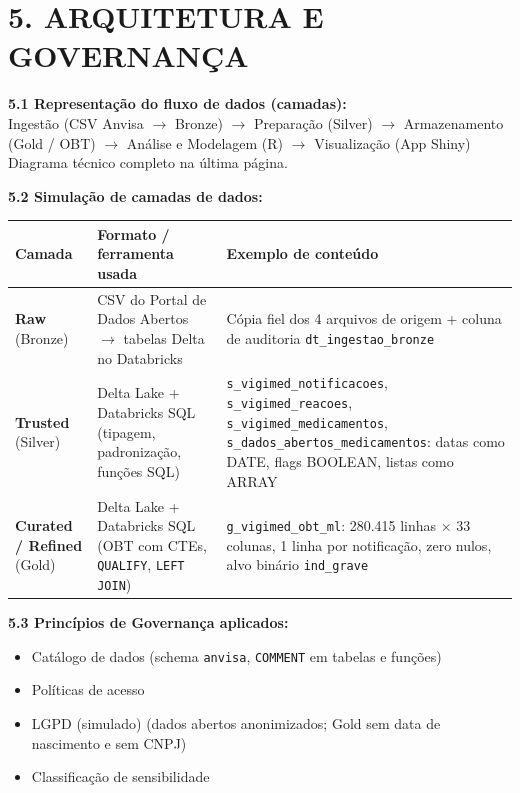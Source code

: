 \documentclass[11pt, a4paper]{article}
\newcommand{\cboxx}{$\boxtimes$} %
\newcommand{\cbox}{\leavevmode\vbox{\hrule\hbox{\vrule height 1.6ex \kern 1.6ex \vrule}\hrule}}
\newcommand{\var}[1]{\texttt{#1}}
\begin{document}
\vspace{6pt}
\section*{5. ARQUITETURA E GOVERNANÇA}

\textbf{5.1 Representação do fluxo de dados (camadas):}\\
Ingestão (CSV Anvisa $\rightarrow$ Bronze) $\rightarrow$ Preparação (Silver) $\rightarrow$ Armazenamento (Gold / OBT) $\rightarrow$ Análise e Modelagem (R) $\rightarrow$ Visualização (App Shiny)\\
{\small Diagrama técnico completo na última página.}

\vspace{4pt}
\textbf{5.2 Simulação de camadas de dados:}

\vspace{2pt}
{\small
\begin{tabular}{|L{0.20\textwidth}|L{0.33\textwidth}|L{0.36\textwidth}|}
\hline
\textbf{Camada} & \textbf{Formato / ferramenta usada} & \textbf{Exemplo de conteúdo} \\
\hline
\textbf{Raw} \newline (Bronze) & CSV do Portal de Dados Abertos $\rightarrow$ tabelas Delta no Databricks & Cópia fiel dos 4 arquivos de origem + coluna de auditoria \var{dt\_ingestao\_bronze} \\
\hline
\textbf{Trusted} \newline (Silver) & Delta Lake + Databricks SQL (tipagem, padronização, funções SQL) & \var{s\_vigimed\_notificacoes}, \var{s\_vigimed\_reacoes}, \var{s\_vigimed\_medicamentos}, \var{s\_dados\_abertos\_\allowbreak medicamentos}: datas como DATE, flags BOOLEAN, listas como ARRAY \\
\hline
\textbf{Curated / Refined} \newline (Gold) & Delta Lake + Databricks SQL (OBT com CTEs, \var{QUALIFY}, \var{LEFT JOIN}) & \var{g\_vigimed\_obt\_ml}: 280.415 linhas $\times$ 33 colunas, 1 linha por notificação, zero nulos, alvo binário \var{ind\_grave} \\
\hline
\end{tabular}
}

\vspace{6pt}
\textbf{5.3 Princípios de Governança aplicados:}
\begin{itemize}
    \item[\cboxx] Catálogo de dados {\small (schema \var{anvisa}, \var{COMMENT} em tabelas e funções)}
    \item[\cbox] Políticas de acesso
    \item[\cboxx] LGPD (simulado) {\small (dados abertos anonimizados; Gold sem data de nascimento e sem CNPJ)}
    \item[\cbox] Classificação de sensibilidade
\end{itemize}
\end{document}
